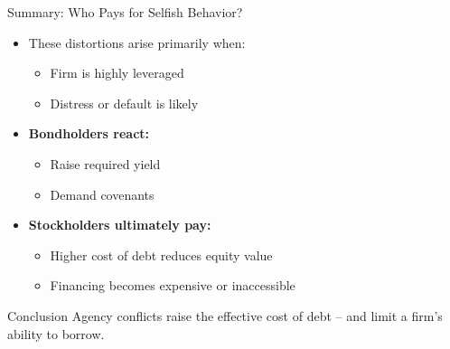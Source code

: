 \begin{frame}{Summary: Who Pays for Selfish Behavior?}
	
	\begin{itemize}
		\item These distortions arise primarily when:
		\begin{itemize}
			\item Firm is highly leveraged
			\item Distress or default is likely
		\end{itemize}
		
		\item \textbf{Bondholders react:}
		\begin{itemize}
			\item Raise required yield
			\item Demand covenants
		\end{itemize}
		
		\item \textbf{Stockholders ultimately pay:}
		\begin{itemize}
			\item Higher cost of debt reduces equity value
			\item Financing becomes expensive or inaccessible
		\end{itemize}
	\end{itemize}
	
	\vspace{0.3cm}
	\begin{alertblock}{Conclusion}
		Agency conflicts raise the effective cost of debt -- and limit a firm's ability to borrow.
	\end{alertblock}
	
\end{frame}

